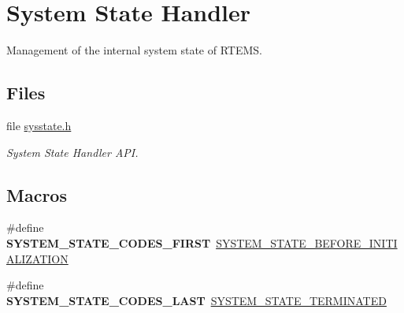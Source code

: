 \hypertarget{group__RTEMSScoreSysState}{}\section{System State Handler}
\label{group__RTEMSScoreSysState}


Management of the internal system state of R\+T\+E\+MS.  


\subsection*{Files}
\begin{DoxyCompactItemize}
\item 
file \mbox{\hyperlink{sysstate_8h}{sysstate.\+h}}
\begin{DoxyCompactList}\small\item\em System State Handler A\+PI. \end{DoxyCompactList}\end{DoxyCompactItemize}
\subsection*{Macros}
\begin{DoxyCompactItemize}
\item 
\mbox{\label{group__RTEMSScoreSysState_ga0c0260c28052f16bf89c18d104c8b3ef}} 
\#define {\bfseries S\+Y\+S\+T\+E\+M\+\_\+\+S\+T\+A\+T\+E\+\_\+\+C\+O\+D\+E\+S\+\_\+\+F\+I\+R\+ST}~\mbox{\hyperlink{group__RTEMSScoreSysState_gga959824776c35a999ecd2720fde987d72abcc8d66092564f2ca7197b4d98cee905}{S\+Y\+S\+T\+E\+M\+\_\+\+S\+T\+A\+T\+E\+\_\+\+B\+E\+F\+O\+R\+E\+\_\+\+I\+N\+I\+T\+I\+A\+L\+I\+Z\+A\+T\+I\+ON}}
\item 
\mbox{\label{group__RTEMSScoreSysState_ga6c25c382793afb9750b12f3dab87e2bf}} 
\#define {\bfseries S\+Y\+S\+T\+E\+M\+\_\+\+S\+T\+A\+T\+E\+\_\+\+C\+O\+D\+E\+S\+\_\+\+L\+A\+ST}~\mbox{\hyperlink{group__RTEMSScoreSysState_gga959824776c35a999ecd2720fde987d72a2c4ef3aa7a6c883fb850bd989a35afed}{S\+Y\+S\+T\+E\+M\+\_\+\+S\+T\+A\+T\+E\+\_\+\+T\+E\+R\+M\+I\+N\+A\+T\+ED}}
\end{DoxyCompactItemize}
